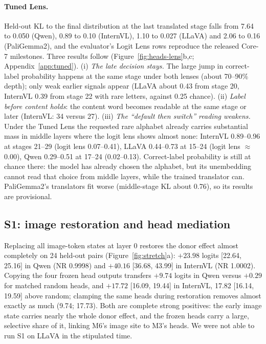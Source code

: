 \documentclass[11pt]{article}
\newcommand{\nr}{\mathrm{NR}}
\begin{document}
\paragraph{Tuned Lens.} Held-out KL to the final distribution at the last translated stage falls from 7.64 to 0.050 (Qwen), 0.89 to 0.10 (InternVL), 1.10 to 0.027 (LLaVA) and 2.06 to 0.16 (PaliGemma2), and the evaluator's Logit Lens rows reproduce the released Core-7 milestones. Three results follow (Figure~\ref{fig:heads-lens}b,c; Appendix~\ref{app:tuned}).
(i) \emph{The late decision stays.} The large jump in correct-label probability happens at the same stage under both lenses (about 70--90\% depth); only weak earlier signals appear (LLaVA about 0.43 from stage 20, InternVL 0.39 from stage 22 with rare letters, against 0.25 chance).
(ii) \emph{Label before content holds}: the content word becomes readable at the same stage or later (InternVL: 34 versus 27).
(iii) \emph{The ``default then switch'' reading weakens.} Under the Tuned Lens the requested rare alphabet already carries substantial mass in middle layers where the logit lens shows almost none: InternVL 0.89--0.96 at stages 21--29 (logit lens 0.07--0.41), LLaVA 0.44--0.73 at 15--24 (logit lens $\approx$0.00), Qwen 0.29--0.51 at 17--24 (0.02--0.13). Correct-label probability is still at chance there: the model has already chosen the alphabet, but its unembedding cannot read that choice from middle layers, while the trained translator can. PaliGemma2's translators fit worse (middle-stage KL about 0.76), so its results are provisional.

\subsection{S1: image restoration and head mediation}

Replacing all image-token states at layer 0 restores the donor effect almost completely on 24 held-out pairs (Figure~\ref{fig:stretch}a): $+23.98$ logits [22.64, 25.16] in Qwen ($\nr$ 0.9998) and $+40.16$ [36.68, 43.99] in InternVL ($\nr$ 1.0002). Copying the four frozen head outputs transfers $+9.74$ logits in Qwen versus $+0.29$ for matched random heads, and $+17.72$ [16.09, 19.44] in InternVL, 17.82 [16.14, 19.59] above random; clamping the same heads during restoration removes almost exactly as much (9.74; 17.73). Both are complete strong positives: the early image state carries nearly the whole donor effect, and the frozen heads carry a large, selective share of it, linking M6's image site to M3's heads. We were not able to run S1 on LLaVA in the stipulated time.
\end{document}
